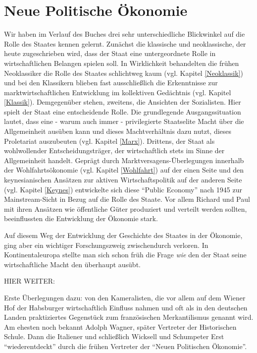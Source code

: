 %
%
%

\chapter{Neue Politische Ökonomie}
\label{Neue_Politik}

Wir haben im Verlauf des Buches drei sehr unterschiedliche Blickwinkel auf die Rolle des Staates kennen gelernt. Zunächst die klassische und neoklassische, der heute zugeschrieben wird, dass der Staat eine untergeordnete Rolle in wirtschaftlichen Belangen spielen soll. In Wirklichkeit behandelten die frühen Neoklassiker die Rolle des Staates schlichtweg kaum (vgl. Kapitel \ref{Neoklassik}) und bei den Klassikern blieben fast ausschließlich die Erkenntnisse zur marktwirtschaftlichen Entwicklung im kollektiven Gedächtnis (vgl. Kapitel \ref{Klassik}). Demgegenüber stehen, zweitens,  die Ansichten der Sozialisten. Hier spielt der Staat eine entscheidende Rolle. Die grundlegende Ausgangssituation lautet, dass eine - warum auch immer - privilegierte Staatselite Macht über die Allgemeinheit ausüben kann und dieses Machtverhältnis dazu nutzt, dieses Proletariat auszubeuten (vgl. Kapitel \ref{Marx}). Drittens, der Staat als wohlwollender Entscheidungsträger, der wirtschaftlich stets im Sinne der Allgemeinheit handelt. Geprägt durch Marktversagens-Überlegungen innerhalb der Wohlfahrtsökonomie (vgl. Kapitel \ref{Wohlfahrt}) auf der einen Seite und den keynesianischen Ansätzen zur aktiven Wirtschaftspolitik auf der anderen Seite (vgl. Kapitel \ref{Keynes}) entwickelte sich diese "`Public Economy"' nach 1945 zur Mainstream-Sicht in Bezug auf die Rolle des Staate. Vor allem Richard \textcite{Musgrave1959} und Paul \textcite{Samuelson1954} mit ihren Ansätzen wie öffentliche Güter produziert und verteilt werden sollten, beeinflussten die Entwicklung der Ökonomie stark.

Auf diesem Weg der Entwicklung der Geschichte des Staates in der Ökonomie, ging aber ein wichtiger Forschungszweig zwischendurch verloren. In Kontinentaleuropa stellte man sich schon früh die Frage \textit{wie} den der Staat seine wirtschaftliche Macht den überhaupt ausübt. 

HIER WEITER:

Erste Überlegungen dazu: von den Kameralisten, die vor allem auf dem Wiener Hof der Habsburger wirtschaftlich Einfluss nahmen und oft als in den deutschen Landen praktiziertes Gegenstück zum französischen Merkantilismus genannt wird. 
Am ehesten noch bekannt Adolph Wagner, später Vertreter der Historischen Schule.
Dann die Italiener und schließlich Wicksell und Schumpeter 
Erst "`wiederentdeckt"' durch die frühen Vertreter der "`Neuen Politischen Ökonomie"'. 

